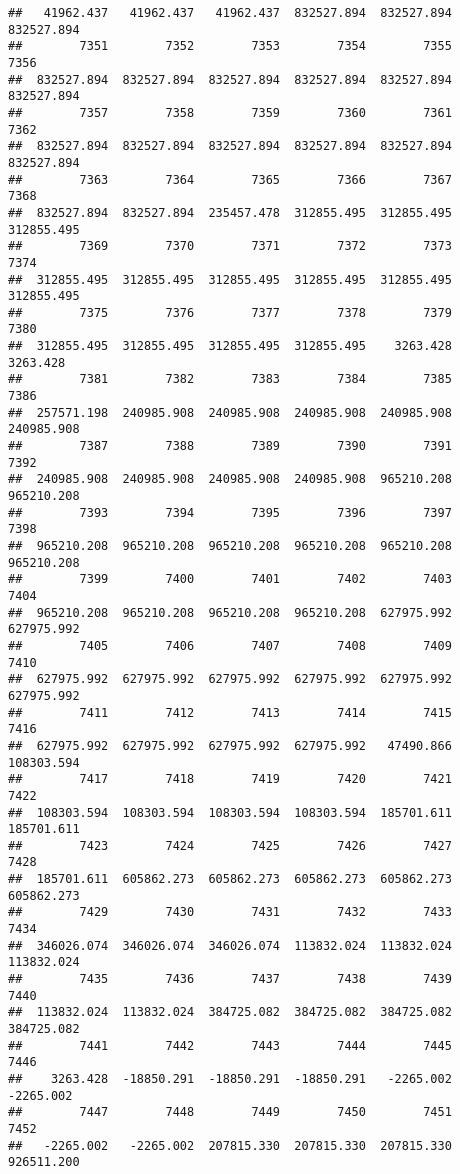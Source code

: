 \documentclass[
]{book}
\begin{document}
\begin{verbatim}
##   41962.437   41962.437   41962.437  832527.894  832527.894  832527.894 
##        7351        7352        7353        7354        7355        7356 
##  832527.894  832527.894  832527.894  832527.894  832527.894  832527.894 
##        7357        7358        7359        7360        7361        7362 
##  832527.894  832527.894  832527.894  832527.894  832527.894  832527.894 
##        7363        7364        7365        7366        7367        7368 
##  832527.894  832527.894  235457.478  312855.495  312855.495  312855.495 
##        7369        7370        7371        7372        7373        7374 
##  312855.495  312855.495  312855.495  312855.495  312855.495  312855.495 
##        7375        7376        7377        7378        7379        7380 
##  312855.495  312855.495  312855.495  312855.495    3263.428    3263.428 
##        7381        7382        7383        7384        7385        7386 
##  257571.198  240985.908  240985.908  240985.908  240985.908  240985.908 
##        7387        7388        7389        7390        7391        7392 
##  240985.908  240985.908  240985.908  240985.908  965210.208  965210.208 
##        7393        7394        7395        7396        7397        7398 
##  965210.208  965210.208  965210.208  965210.208  965210.208  965210.208 
##        7399        7400        7401        7402        7403        7404 
##  965210.208  965210.208  965210.208  965210.208  627975.992  627975.992 
##        7405        7406        7407        7408        7409        7410 
##  627975.992  627975.992  627975.992  627975.992  627975.992  627975.992 
##        7411        7412        7413        7414        7415        7416 
##  627975.992  627975.992  627975.992  627975.992   47490.866  108303.594 
##        7417        7418        7419        7420        7421        7422 
##  108303.594  108303.594  108303.594  108303.594  185701.611  185701.611 
##        7423        7424        7425        7426        7427        7428 
##  185701.611  605862.273  605862.273  605862.273  605862.273  605862.273 
##        7429        7430        7431        7432        7433        7434 
##  346026.074  346026.074  346026.074  113832.024  113832.024  113832.024 
##        7435        7436        7437        7438        7439        7440 
##  113832.024  113832.024  384725.082  384725.082  384725.082  384725.082 
##        7441        7442        7443        7444        7445        7446 
##    3263.428  -18850.291  -18850.291  -18850.291   -2265.002   -2265.002 
##        7447        7448        7449        7450        7451        7452 
##   -2265.002   -2265.002  207815.330  207815.330  207815.330  926511.200 

\end{verbatim}
\end{document}
